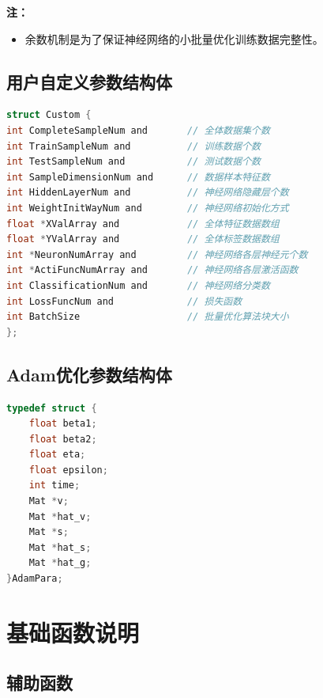 \documentclass[UTF-8]{progbookcn}
\begin{document}
\noindent\textbf{注：}
\begin{itemize}
  \item 余数机制是为了保证神经网络的小批量优化训练数据完整性。
\end{itemize}


\subsection{用户自定义参数结构体}
\begin{lstlisting}[language=C,caption={用户自定义结构体}]
struct Custom {
int CompleteSampleNum and       // 全体数据集个数
int TrainSampleNum and          // 训练数据个数
int TestSampleNum and           // 测试数据个数
int SampleDimensionNum and      // 数据样本特征数
int HiddenLayerNum and          // 神经网络隐藏层个数
int WeightInitWayNum and        // 神经网络初始化方式
float *XValArray and            // 全体特征数据数组
float *YValArray and            // 全体标签数据数组
int *NeuronNumArray and         // 神经网络各层神经元个数
int *ActiFuncNumArray and       // 神经网络各层激活函数
int ClassificationNum and       // 神经网络分类数
int LossFuncNum and             // 损失函数
int BatchSize                   // 批量优化算法块大小
};
\end{lstlisting}


\subsection{Adam优化参数结构体}
\begin{lstlisting}[language=C,caption={Adam优化参数结构体}]
typedef struct {
	float beta1;
	float beta2;
	float eta;
	float epsilon;
	int time;
	Mat *v;
	Mat *hat_v;
	Mat *s;
	Mat *hat_s;
	Mat *hat_g;
}AdamPara;
\end{lstlisting}

\section{基础函数说明}
\subsection{辅助函数}
\begin{table}[!h]
\centering
\caption{辅助函数}
\end{table}
\end{document}
